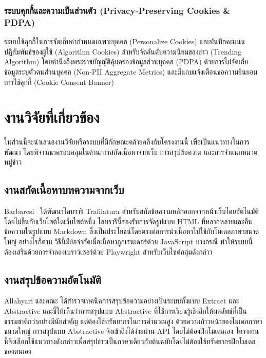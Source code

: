 \subsubsection{ระบบคุกกี้และความเป็นส่วนตัว (Privacy-Preserving Cookies \& PDPA)}
ระบบใช้คุกกี้ในการจัดเก็บค่ากำหนดเฉพาะบุคคล (Personalize Cookies) และบันทึกคะแนนปฏิสัมพันธ์ของผู้ใช้ (Algorithm Cookies) สำหรับจัดอันดับความนิยมของข่าว (Trending Algorithm) โดยคำนึงถึงพระราชบัญญัติคุ้มครองข้อมูลส่วนบุคคล (PDPA) ด้วยการไม่จัดเก็บข้อมูลระบุตัวตนส่วนบุคคล (Non-PII Aggregate Metrics) และมีแถบแจ้งเตือนขอความยินยอมการใช้คุกกี้ (Cookie Consent Banner)

\section{งานวิจัยที่เกี่ยวข้อง}

ในส่วนนี้จะนำเสนองานวิจัยหรือระบบที่มีลักษณะคล้ายคลึงกับโครงงานนี้ เพื่อเป็นแนวทางในการพัฒนา โดยพิจารณาครอบคลุมในด้านการสกัดเนื้อหาจากเว็บ การสรุปข้อความ และการจำแนกหมวดหมู่ข่าว

\subsection{งานสกัดเนื้อหาบทความจากเว็บ}

Barbaresi~\textcite{barbaresi-2021-trafilatura} ได้พัฒนาไลบรารี Trafilatura สำหรับสกัดข้อความหลักออกจากหน้าเว็บโดยอัตโนมัติ โดยไม่ขึ้นกับเว็บไซต์ใดเว็บไซต์หนึ่ง ไลบรารีนี้รองรับการจัดรูปแบบ HTML ที่หลากหลายและคืนข้อความในรูปแบบ Markdown ซึ่งเป็นประโยชน์โดยตรงต่อการนำเนื้อหาไปใช้กับโมเดลภาษาขนาดใหญ่ อย่างไรก็ตาม วิธีนี้มีข้อจำกัดเมื่อเนื้อหาถูกเรนเดอร์ด้วย JavaScript บางกรณี ทำให้ระบบนี้ต้องเสริมด้วยการจำลองเบราว์เซอร์ด้วย Playwright สำหรับเว็บไซต์กลุ่มดังกล่าว

\subsection{งานสรุปข้อความอัตโนมัติ}

Allahyari และคณะ \parencite{allahyari2017} ได้สำรวจเทคนิคการสรุปข้อความอย่างเป็นระบบทั้งแบบ Extract และ Abstractive และชี้ให้เห็นว่าการสรุปแบบ Abstractive ที่ใช้การเรียนรู้เชิงลึกให้ผลลัพธ์ที่เป็นธรรมชาติกว่าอย่างมีนัยสำคัญ แต่ต้องใช้ทรัพยากรในการคำนวณสูง ด้วยความก้าวหน้าของโมเดลภาษาขนาดใหญ่ \parencite{gemini2024} การสรุปแบบ Abstractive จึงเข้าถึงได้ง่ายผ่าน API โดยไม่ต้องฝึกโมเดลเอง โครงงานนี้จึงเลือกใช้แนวทางดังกล่าวเพื่อสรุปข่าวเป็นภาษาเดียวกับต้นฉบับโดยไม่ต้องใช้ทรัพยากรฝึกโมเดลของตนเอง

